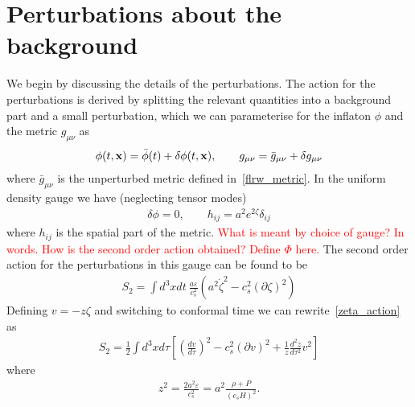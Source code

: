 \section{Perturbations about the background}
    We begin by discussing the details of the perturbations.
    The action for the perturbations is derived by
    splitting the relevant quantities into a background
    part and a small perturbation, which we can parameterise
    for the inflaton $\phi$ and the metric $g_{\mu\nu}$ as
    \begin{align}
        \phi(t,\mathbf{x})=\bar{\phi}(t)+\delta\phi(t,\mathbf{x}), \qquad g_{\mu\nu}=\bar{g}_{\mu\nu}+\delta g_{\mu\nu}
    \end{align}
    where $\bar{g}_{\mu\nu}$ is the unperturbed metric defined in~\eqref{flrw_metric}.
    In the uniform density gauge we have (neglecting tensor modes)
    \begin{align}
        \delta \phi=0, \qquad h_{ij}=a^2 e^{2\zeta} \delta_{ij}
    \end{align}
    where $h_{ij}$ is the spatial part of the metric.
    \textcolor{red}{What is meant by choice of gauge? In words. How is the
    second order action obtained?}
    \textcolor{red}{Define $\Phi$ here.}
    The second order action for the perturbations in this gauge can be found to be
    \begin{align}\label{zeta_action}
        S_{2} = \int d^3x dt~\frac{a\varepsilon}{c_s^2}\left(a^2\dot{\zeta}^2-c_s^2\left(\partial\zeta\right)^2\right)
    \end{align}
    Defining $v=-z\zeta$ and switching to conformal time we can rewrite~\eqref{zeta_action} as
    \begin{align}\label{v_action}
        S_{2} = \frac{1}{2}\int d^3x d\tau \left[{\left(\frac{d v}{d \tau}\right)}^2-c_s^2\left(\partial v\right)^2+\frac{1}{z}\frac{d^2z}{d\tau^2}v^2\right]
    \end{align}
    where
    \begin{align}\label{z_defn}
        z^2 = \frac{2a^2\varepsilon}{c_s^2} = a^2\frac{\rho+P}{\left(c_sH\right)^2}.
    \end{align}
